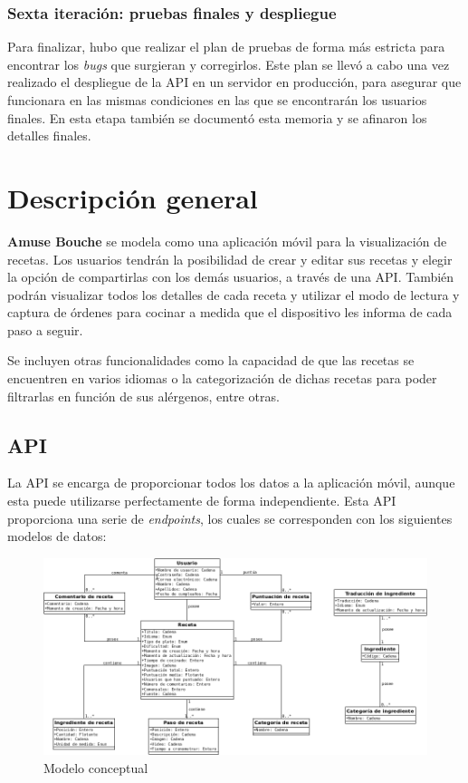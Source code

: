 \documentclass[a4paper,12pt]{article}
\begin{document}
\subsubsection{Sexta iteración: pruebas finales y despliegue}
\label{sec:sexta_iteracion}

Para finalizar, hubo que realizar el plan de pruebas de forma más estricta para
encontrar los \textit{bugs} que surgieran y corregirlos. Este plan se llevó a
cabo una vez realizado el despliegue de la API en un servidor en producción, para
asegurar que funcionara en las mismas condiciones en las que se encontrarán los
usuarios finales. En esta etapa también se documentó esta memoria y se afinaron
los detalles finales.



\section{Descripción general}

\textbf{Amuse Bouche} se modela como una aplicación móvil para la visualización
de recetas. Los usuarios tendrán la posibilidad de crear y editar sus recetas y
elegir la opción de compartirlas con los demás usuarios, a través de una API.
También podrán visualizar todos los detalles de cada receta y utilizar el modo
de lectura y captura de órdenes para cocinar a medida que el dispositivo les
informa de cada paso a seguir.

Se incluyen otras funcionalidades como la capacidad de que las recetas se
encuentren en varios idiomas o la categorización de dichas recetas para poder
filtrarlas en función de sus alérgenos, entre otras.


\subsection{API}

La API se encarga de proporcionar todos los datos a la aplicación móvil, aunque
esta puede utilizarse perfectamente de forma independiente. Esta API proporciona
una serie de \textit{endpoints}, los cuales se corresponden con los siguientes
modelos de datos:

\begin{figure}[H]
  \centering
  \includegraphics[width=\textwidth]{./img/diagrama_clases_conceptuales}
  \caption{Modelo conceptual}
  \label{fig:modelo-conceptual}
\end{figure}
\end{document}
